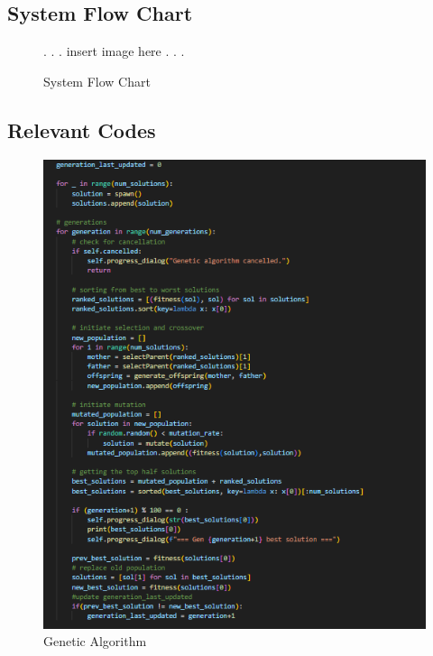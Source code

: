 \begin{appendices}
	
	\begin{centerappendixtitle}
		\chapter{System Flow Chart}
		\pagebreak
		
		\begin{figure}[h]
			\centering
			\caption{System Flow Chart}
			\label{fig:scene-one}
			
			. . . insert image here . . .
			
		\end{figure}
		
		
	\end{centerappendixtitle}
	
	\begin{centerappendixtitle}
		\chapter{Relevant Codes}
		\pagebreak
		
		\begin{figure}[h]
			\centering
			\caption{Genetic Algorithm}
			\label{genalgoCode}
			\includegraphics[width=\linewidth]{appendix/gen algo}
		\end{figure}
		

\end{centerappendixtitle}
\end{appendices}
